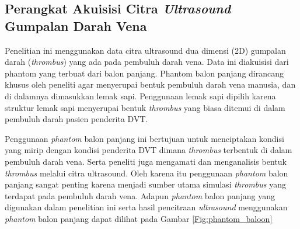 \subsection{Perangkat Akuisisi Citra \textit{Ultrasound} Gumpalan Darah Vena}
Penelitian ini menggunakan data citra ultrasound dua dimensi (2D) gumpalan darah (\textit{thrombus}) yang ada pada pembuluh darah vena. Data ini diakuisisi dari phantom yang terbuat dari balon panjang. Phantom balon panjang dirancang khusus oleh peneliti agar menyerupai bentuk pembuluh darah vena manusia, dan di dalamnya dimasukkan lemak sapi. Penggunaan lemak sapi dipilih karena struktur lemak sapi menyerupai bentuk \textit{thrombus} yang biasa ditemui di dalam pembuluh darah pasien penderita DVT. 

Penggunaan \textit{phantom} balon panjang ini bertujuan untuk menciptakan kondisi yang mirip dengan kondisi penderita DVT dimana \textit{thrombus} terbentuk di dalam pembuluh darah vena. Serta peneliti juga mengamati dan menganalisis bentuk \textit{thrombus} melalui citra ultrasound. Oleh karena itu penggunaan \textit{phantom} balon panjang sangat penting karena menjadi sumber utama  simulasi \textit{thrombus} yang terdapat pada pembuluh darah vena. Adapun \textit{phantom} balon panjang yang digunakan dalam penelitian ini serta hasil pencitraan \textit{ultrasound} menggunakan \textit{phantom} balon panjang dapat dilihat pada Gambar \ref{Fig:phantom_baloon}

